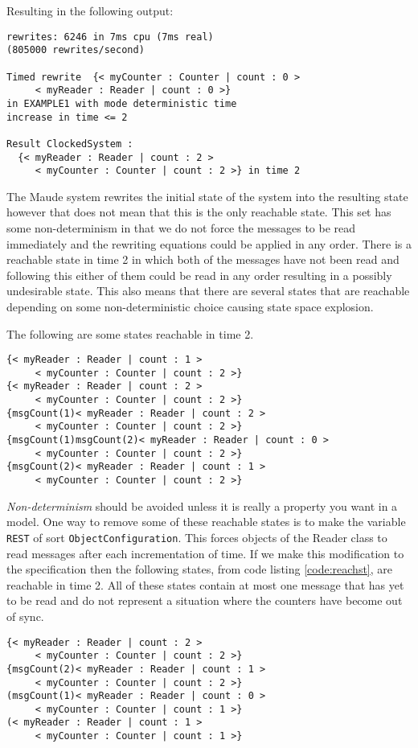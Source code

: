 Resulting in the following output:
\medskip
\begin{lstlisting}
rewrites: 6246 in 7ms cpu (7ms real) 
(805000 rewrites/second)

Timed rewrite  {< myCounter : Counter | count : 0 > 
     < myReader : Reader | count : 0 >} 
in EXAMPLE1 with mode deterministic time 
increase in time <= 2

Result ClockedSystem :
  {< myReader : Reader | count : 2 > 
     < myCounter : Counter | count : 2 >} in time 2
\end{lstlisting}

The Maude system rewrites the initial state of the system into the resulting state however that does not mean that this is the only reachable state. This set has some non-determinism in that we do not force the messages to be read immediately and the rewriting equations could be applied in any order. There is a reachable state in time 2 in which both of the messages have not been read and following this either of them could be read in any order resulting in a possibly undesirable state. This also means that there are several states that are reachable depending on some non-deterministic choice causing state space explosion.

The following are some states reachable in time 2.

\begin{lstlisting}[caption = Some of the states reachable by rewriting EXAMPLE1 in two time steps, label = code:reachst ]
{< myReader : Reader | count : 1 >
     < myCounter : Counter | count : 2 >}
{< myReader : Reader | count : 2 > 
     < myCounter : Counter | count : 2 >}
{msgCount(1)< myReader : Reader | count : 2 > 
     < myCounter : Counter | count : 2 >}
{msgCount(1)msgCount(2)< myReader : Reader | count : 0 >
     < myCounter : Counter | count : 2 >}
{msgCount(2)< myReader : Reader | count : 1 >
     < myCounter : Counter | count : 2 >}
\end{lstlisting}

\emph{Non-determinism} should be avoided unless it is really a property you want in a model. One way to remove some of these reachable states is to make the variable \texttt{REST} of sort \texttt{ObjectConfiguration}. This forces objects of the Reader class to read messages after each incrementation of time. If we make this modification to the specification then the following states, from code listing \ref{code:reachst}, are reachable in time 2. All of these states contain at most one message that has yet to be read and do not represent a situation where the counters have become out of sync.
\medskip
\begin{lstlisting}[caption = States reachable by the modified EXAMPLE1 in two time steps]
{< myReader : Reader | count : 2 > 
     < myCounter : Counter | count : 2 >}
{msgCount(2)< myReader : Reader | count : 1 > 
     < myCounter : Counter | count : 2 >}
(msgCount(1)< myReader : Reader | count : 0 > 
     < myCounter : Counter | count : 1 >}
(< myReader : Reader | count : 1 > 
     < myCounter : Counter | count : 1 >}
\end{lstlisting}


